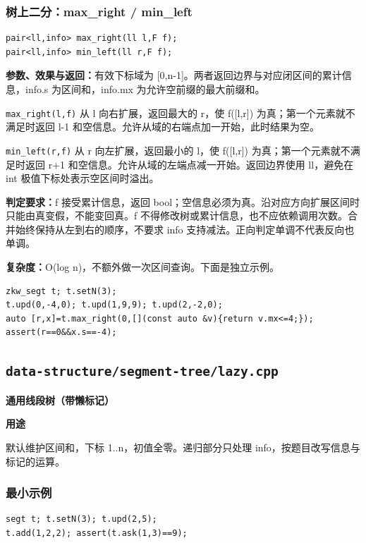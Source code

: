 \documentclass[UTF8,a4paper,10pt]{ctexart}
\newcommand{\TemplUsage}[1]{\textbf{用途}\par #1\par}
\begin{document}
\noindent\begin{minipage}{\textwidth}
\subsubsection*{树上二分：max\_right / min\_left}
\begin{lstlisting}
pair<ll,info> max_right(ll l,F f);
pair<ll,info> min_left(ll r,F f);
\end{lstlisting}
\textbf{参数、效果与返回：}有效下标域为 [0,n-1]。两者返回边界与对应闭区间的累计信息，info.s 为区间和，info.mx 为允许空前缀的最大前缀和。

\texttt{max\_right(l,f)} 从 l 向右扩展，返回最大的 r，使 f([l,r]) 为真；第一个元素就不满足时返回 l-1 和空信息。允许从域的右端点加一开始，此时结果为空。

\texttt{min\_left(r,f)} 从 r 向左扩展，返回最小的 l，使 f([l,r]) 为真；第一个元素就不满足时返回 r+1 和空信息。允许从域的左端点减一开始。返回边界使用 ll，避免在 int 极值下标处表示空区间时溢出。

\textbf{判定要求：}f 接受累计信息，返回 bool；空信息必须为真。沿对应方向扩展区间时只能由真变假，不能变回真。f 不得修改树或累计信息，也不应依赖调用次数。合并始终保持从左到右的顺序，不要求 info 支持减法。正向判定单调不代表反向也单调。

\textbf{复杂度：}O(log n)，不额外做一次区间查询。下面是独立示例。
\begin{lstlisting}
zkw_segt t; t.setN(3);
t.upd(0,-4,0); t.upd(1,9,9); t.upd(2,-2,0);
auto [r,x]=t.max_right(0,[](const auto &v){return v.mx<=4;});
assert(r==0&&x.s==-4);
\end{lstlisting}

\end{minipage}\par
\clearpage
\subsection{\texttt{data-structure/segment-tree/lazy.cpp}}
\textbf{通用线段树（带懒标记）}\par
\TemplUsage{默认维护区间和，下标 1..n，初值全零。递归部分只处理 info，按题目改写信息与标记的运算。}
\subsubsection*{最小示例}
\begin{lstlisting}
segt t; t.setN(3); t.upd(2,5);
t.add(1,2,2); assert(t.ask(1,3)==9);
\end{lstlisting}
\end{document}
